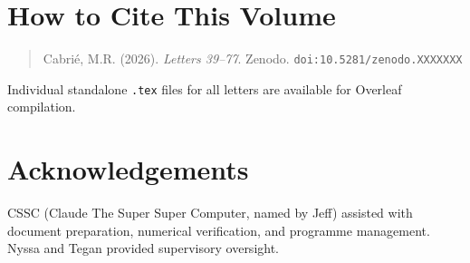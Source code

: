 \documentclass[aps,preprint,superscriptaddress,floatfix]{revtex4-2}
\begin{document}
\section*{How to Cite This Volume}
\begin{quote}
Cabri\'{e}, M.R. (2026). \textit{Letters 39--77}.
Zenodo. \texttt{doi:10.5281/zenodo.XXXXXXX}
\end{quote}

Individual standalone \texttt{.tex} files for all letters
are available for Overleaf compilation.

\section*{Acknowledgements}
CSSC (Claude The Super Super Computer, named by Jeff) assisted
with document preparation, numerical verification, and programme
management. Nyssa and Tegan provided supervisory oversight.
\end{document}
